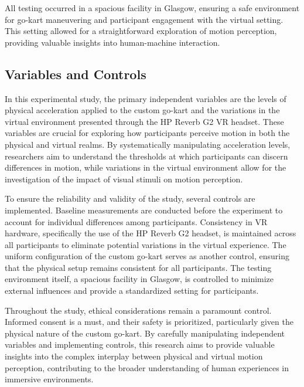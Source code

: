 \documentclass[a4paper, 12pt, oneside]{article}
\begin{document}
        All testing occurred in a spacious facility in Glasgow, ensuring a safe environment for go-kart maneuvering and participant 
        engagement with the virtual setting. This setting allowed for a straightforward exploration of motion perception, providing 
        valuable insights into human-machine interaction.

        \subsection{Variables and Controls}
        
        In this experimental study, the primary independent variables are the levels of physical acceleration applied to the custom 
        go-kart and the variations in the virtual environment presented through the HP Reverb G2 VR headset. These variables are 
        crucial for exploring how participants perceive motion in both the physical and virtual realms. By systematically 
        manipulating acceleration levels, researchers aim to understand the thresholds at which participants can discern differences 
        in motion, while variations in the virtual environment allow for the investigation of the impact of visual stimuli on motion 
        perception.

        To ensure the reliability and validity of the study, several controls are implemented. Baseline measurements are conducted 
        before the experiment to account for individual differences among participants. Consistency in VR hardware, specifically 
        the use of the HP Reverb G2 headset, is maintained across all participants to eliminate potential variations in the virtual 
        experience. The uniform configuration of the custom go-kart serves as another control, ensuring that the physical setup 
        remains consistent for all participants. The testing environment itself, a spacious facility in Glasgow, is controlled to 
        minimize external influences and provide a standardized setting for participants.

        Throughout the study, ethical considerations remain a paramount control. Informed consent is a must, 
        and their safety is prioritized, particularly given the physical nature of the custom go-kart. By carefully manipulating 
        independent variables and implementing controls, this research aims to provide valuable insights into the complex interplay 
        between physical and virtual motion perception, contributing to the broader understanding of human experiences in immersive 
        environments.
\end{document}
